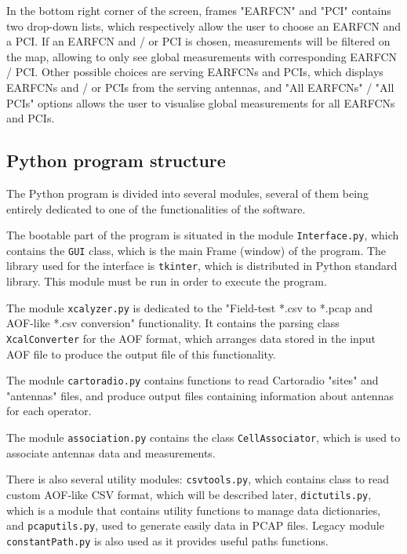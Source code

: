 \documentclass[a4paper, 11pt]{report}
\begin{document}
    In the bottom right corner of the screen, frames "EARFCN" and "PCI" contains two drop-down lists, which respectively allow the user to choose an EARFCN and a PCI. If an EARFCN and / or PCI is chosen, measurements will be filtered on the map, allowing to only see global measurements with corresponding EARFCN / PCI. Other possible choices are serving EARFCNs and PCIs, which displays EARFCNs and / or PCIs from the serving antennas, and "All EARFCNs" / "All PCIs" options allows the user to visualise global measurements for all EARFCNs and PCIs. \newline
    
    \subsection{Python program structure}
    
    The Python program is divided into several modules, several of them being entirely dedicated to one of the  functionalities of the software. \newline
    
    The bootable part of the program is situated in the module \texttt{Interface.py}, which contains the \texttt{GUI} class, which is the main Frame (window) of the program. The library used for the interface is \texttt{tkinter}, which is distributed in Python standard library. This module must be run in order to execute the program. \newline
    
    The module \texttt{xcalyzer.py} is dedicated to the "Field-test *.csv to *.pcap and AOF-like *.csv conversion" functionality. It contains the parsing class \texttt{XcalConverter} for the AOF format, which arranges data stored in the input AOF file to produce the output file of this functionality. \newline
    
    The module \texttt{cartoradio.py} contains functions to read Cartoradio "sites" and "antennas" files, and produce output files containing information about antennas for each operator. \newline
    
    The module \texttt{association.py} contains the class \texttt{CellAssociator}, which is used to associate antennas data and measurements. \newline
    
    There is also several utility modules: \texttt{csvtools.py}, which contains class to read custom AOF-like CSV format, which will be described later, \texttt{dictutils.py}, which is a module that contains utility functions to manage data dictionaries, and \texttt{pcaputils.py}, used to generate easily data in PCAP files. Legacy module \texttt{constantPath.py} is also used as it provides useful paths functions. \newline
    
\end{document}
